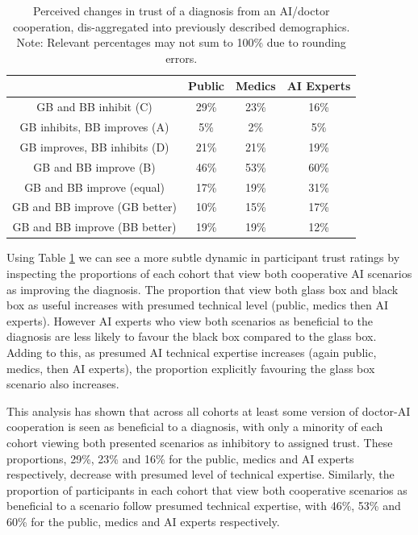 \documentclass[manuscript,screen,review]{acmart}
\begin{document}
\begin{table}[h]
\begin{tabular}{c||c|c|c}
     & Public & Medics & AI Experts \\
     \hline \hline
    GB and BB inhibit (C)            & 29\% & 23\% & 16\%\\ \hline
    GB inhibits, BB improves (A)     & 5\%  & 2\%  & 5\% \\
    GB improves, BB inhibits (D)     & 21\% & 21\% & 19\%\\  \hline
    GB and BB improve (B)            & 46\% & 53\% & 60\%\\ \hline
    GB and BB improve (equal)        & 17\% & 19\% & 31\%\\
    GB and BB improve (GB better)    & 10\% & 15\% & 17\%\\
    GB and BB improve (BB better)    & 19\% & 19\% & 12\%\\ 
\end{tabular}
\caption{\label{tab:demographic_trust_change}Perceived changes in trust of a diagnosis from an AI/doctor cooperation, dis-aggregated into previously described demographics. Note: Relevant percentages may not sum to 100\% due to rounding errors.}
\end{table}

Using Table \ref{tab:demographic_trust_change} we can see a more subtle dynamic in participant trust ratings by inspecting the proportions of each cohort that view both cooperative AI scenarios as improving the diagnosis. The proportion that view both glass box and black box as useful increases with presumed technical level (public, medics then AI experts). However AI experts who view both scenarios as beneficial to the diagnosis are less likely to favour the black box compared to the glass box. Adding to this, as presumed AI technical expertise increases (again public, medics, then AI experts), the proportion explicitly favouring the glass box scenario also increases.

This analysis has shown that across all cohorts at least some version of doctor-AI cooperation is seen as beneficial to a diagnosis, with only a minority of each cohort viewing both presented scenarios as inhibitory to assigned trust. These proportions, 29\%, 23\% and 16\% for the public, medics and AI experts respectively, decrease with presumed level of technical expertise. Similarly, the proportion of participants in each cohort that view both cooperative scenarios as beneficial to a scenario follow presumed technical expertise, with 46\%, 53\% and 60\% for the public, medics and AI experts respectively.
\end{document}
